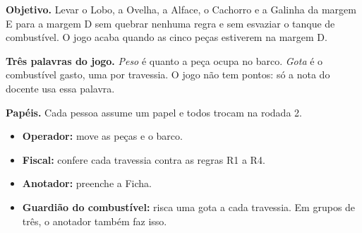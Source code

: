 \documentclass[12pt,a4paper]{article}
\begin{document}
\begin{tcolorbox}[colback=white,colframe=blue!50!black,coltitle=white,
  colbacktitle=blue!50!black,title={\bfseries Travessia do Rio},
  boxrule=1pt,arc=3mm,fontupper=\small\setstretch{1.12}]
\textbf{Objetivo.} Levar o Lobo, a Ovelha, a Alface, o Cachorro e a Galinha da
margem E para a margem D sem quebrar nenhuma regra e sem esvaziar o tanque de
combustível. O jogo acaba quando as cinco peças estiverem na margem D.

\smallskip
\textbf{Três palavras do jogo.} \textit{Peso} é quanto a peça ocupa no barco.
\textit{Gota} é o combustível gasto, uma por travessia. O jogo não tem pontos: só
a nota do docente usa essa palavra.

\smallskip
\textbf{Papéis.} Cada pessoa assume um papel e todos trocam na rodada 2.
\begin{itemize}[leftmargin=*,itemsep=1pt,topsep=2pt]
  \item \textbf{Operador:} move as peças e o barco.
  \item \textbf{Fiscal:} confere cada travessia contra as regras R1 a R4.
  \item \textbf{Anotador:} preenche a Ficha.
  \item \textbf{Guardião do combustível:} risca uma gota a cada travessia. Em
        grupos de três, o anotador também faz isso.
\end{itemize}


\end{tcolorbox}
\end{document}

